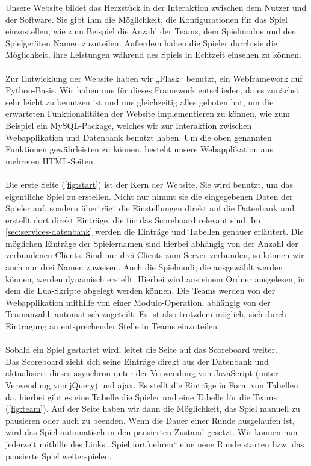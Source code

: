 Unsere Website bildet das Herzstück in der Interaktion zwischen dem Nutzer und der Software. Sie gibt ihm die Möglichkeit, die Konfigurationen für das Spiel einzustellen, wie zum Beispiel die Anzahl der Teams, dem Spielmodus und den Spielgeräten Namen zuzuteilen. Außerdem haben die Spieler durch sie die Möglichkeit, ihre Leistungen während des Spiels in Echtzeit einsehen zu können.\\\\
Zur Entwicklung der Website haben wir „Flask“ benutzt, ein Webframework auf Python-Basis. Wir haben uns für dieses Framework entschieden, da es zunächst sehr leicht zu benutzen ist und uns gleichzeitig alles geboten hat, um die erwarteten Funktionalitäten der Website implementieren zu können, wie zum Beispiel ein MySQL-Package, welches wir zur Interaktion zwischen Webapplikation und Datenbank benutzt haben.
Um die oben genannten Funktionen gewährleisten zu können, besteht unsere Webapplikation aus mehreren HTML-Seiten.\\\\
Die erste Seite (\cref{fig:start}) ist der Kern der Website. Sie wird benutzt, um das eigentliche Spiel zu erstellen. Nicht nur nimmt sie die eingegebenen Daten der Spieler auf, sondern überträgt die Einstellungen direkt auf die Datenbank und erstellt dort direkt Einträge, die für das Scoreboard relevant sind. Im \cref{sec:services-datenbank} werden die Einträge und Tabellen genauer erläutert. Die möglichen Einträge der Spielernamen sind hierbei abhängig von der Anzahl der verbundenen Clients. Sind nur drei Clients zum Server verbunden, so können wir auch nur drei Namen zuweisen.
Auch die Spielmodi, die ausgewählt werden können, werden dynamisch erstellt. Hierbei wird aus einem Ordner ausgelesen, in dem die Lua-Skripte abgelegt werden können. Die Teams werden von der Webapplikation mithilfe von einer Modulo-Operation, abhängig von der Teamanzahl, automatisch zugeteilt. Es ist also trotzdem möglich, sich durch Eintragung an entsprechender Stelle in Teams einzuteilen.\\\\
Sobald ein Spiel gestartet wird, leitet die Seite auf das Scoreboard weiter.\\ Das Scoreboard zieht sich seine Einträge direkt aus der Datenbank und aktualisiert dieses asynchron unter der Verwendung von JavaScript (unter Verwendung von jQuery) und ajax. Es stellt die Einträge in Form von Tabellen da, hierbei gibt es eine Tabelle die Spieler und eine Tabelle für die Teams (\cref{fig:team}). Auf der Seite haben wir dann die Möglichkeit, das Spiel manuell zu pausieren oder auch zu beenden. Wenn die Dauer einer Runde ausgelaufen ist, wird das Spiel automatisch in den pausierten Zustand gesetzt. Wir können nun jederzeit mithilfe des Links „Spiel fortfuehren“ eine neue Runde starten bzw. das pausierte Spiel weiterspielen.\\
